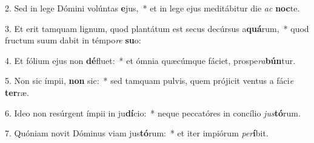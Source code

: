 2. Sed in lege Dómini volúntas \textbf{e}jus,~*  et in lege ejus meditábitur die \textit{ac} \textbf{noc}te.\

3. Et erit tamquam lignum, quod plantátum est secus decúrsus a\textbf{quá}rum,~*  quod fructum suum dabit in témpo\textit{re} \textbf{su}o:\

4. Et fólium ejus non \textbf{dé}fluet:~*  et ómnia quæcúmque fáciet, prospe\textit{ra}\textbf{bún}tur.\

5. Non sic ímpii, \textbf{non} sic:~*  sed tamquam pulvis, quem prójicit ventus a fáci\textit{e} \textbf{ter}ræ.\

6. Ideo non resúrgent ímpii in ju\textbf{dí}cio:~*  neque peccatóres in concílio \textit{jus}\textbf{tó}rum.\

7. Quóniam novit Dóminus viam jus\textbf{tó}rum:~*  et iter impiórum \textit{per}\textbf{í}bit.\

